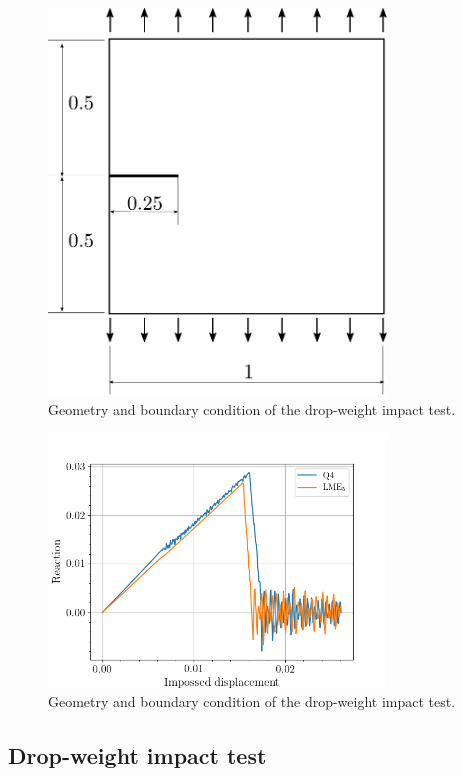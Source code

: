 \message{ !name(2020_EFM_MPM_Eigensoftening.tex)}\documentclass[preprint,12pt,a4paper]{elsarticle}
\begin{document}
\begin{figure}
  \centering
  \includegraphics[width=0.8\textwidth]{Figures/Mode_I}
  \caption{Geometry and boundary condition of the drop-weight impact test.}
  \label{fig:geometry-cracked-panel-mode-I}
\end{figure}

\begin{figure}
  \centering
  \includegraphics[width=0.8\textwidth]{Figures/Reactions_displacements_square_panel_mode_I}
  \caption{Geometry and boundary condition of the drop-weight impact test.}
  \label{fig:geometry-cracked-panel-mode-I}
\end{figure}


\subsection{Drop-weight impact test}
\label{sec:3.3}
\end{document}
